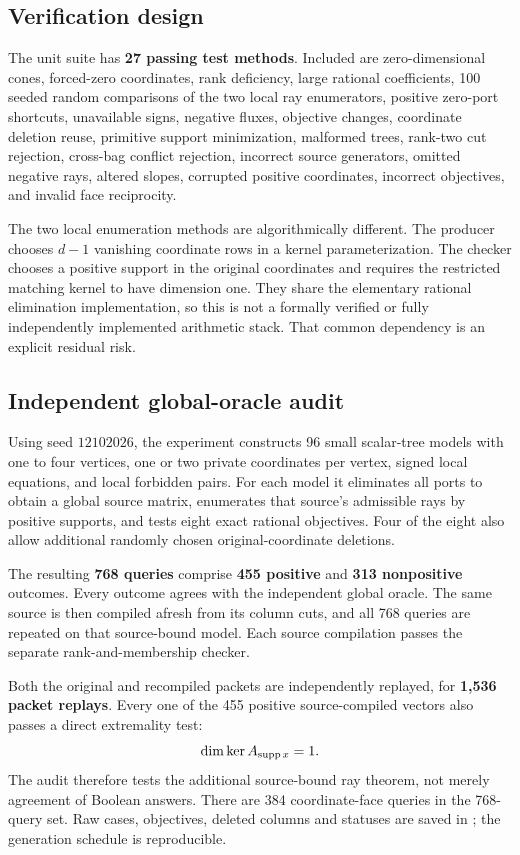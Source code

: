 \subsection{Verification design}

The unit suite has \textbf{27 passing test methods}. Included are zero-dimensional
cones, forced-zero coordinates, rank deficiency, large rational coefficients,
100 seeded random comparisons of the two local ray enumerators, positive
zero-port shortcuts, unavailable signs, negative fluxes, objective changes,
coordinate deletion reuse, primitive support minimization, malformed trees,
rank-two cut rejection, cross-bag conflict rejection, incorrect source
generators, omitted negative rays, altered slopes, corrupted positive
coordinates, incorrect objectives, and invalid face reciprocity.

The two local enumeration methods are algorithmically different. The producer
chooses $d-1$ vanishing coordinate rows in a kernel parameterization. The checker
chooses a positive support in the original coordinates and requires the
restricted matching kernel to have dimension one. They share the elementary
rational elimination implementation, so this is not a formally verified or
fully independently implemented arithmetic stack. That common dependency is
an explicit residual risk.

\subsection{Independent global-oracle audit}

Using seed $12102026$, the experiment constructs 96 small scalar-tree models
with one to four vertices, one or two private coordinates per vertex, signed
local equations, and local forbidden pairs. For each model it eliminates all
ports to obtain a global source matrix, enumerates that source's admissible
rays by positive supports, and tests eight exact rational objectives. Four of
the eight also allow additional randomly chosen original-coordinate deletions.

The resulting \textbf{768 queries} comprise \textbf{455 positive} and
\textbf{313 nonpositive} outcomes. Every outcome agrees with the independent
global oracle. The same source is then compiled afresh from its column cuts,
and all 768 queries are repeated on that source-bound model. Each source
compilation passes the separate rank-and-membership checker.

Both the original and recompiled packets are independently replayed, for
\textbf{1,536 packet replays}. Every one of the 455 positive source-compiled
vectors also passes a direct extremality test:
\[
 \dim\ker A_{\operatorname{supp} x}=1.
\]
The audit therefore tests the additional source-bound ray theorem, not merely
agreement of Boolean answers. There are 384 coordinate-face queries in the
768-query set. Raw cases, objectives, deleted columns and statuses are saved
in ; the generation schedule is reproducible.

